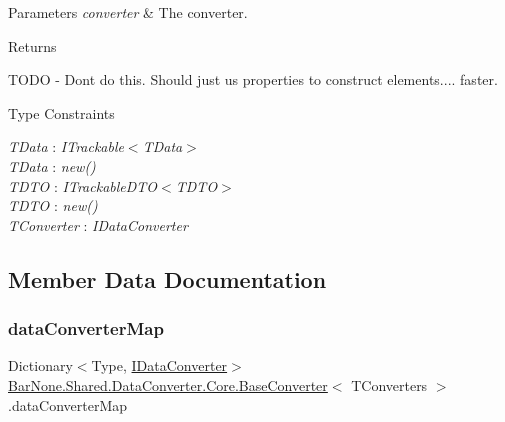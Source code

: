 \begin{DoxyParams}{Parameters}
{\em converter} & The converter.\\
\hline
\end{DoxyParams}
\begin{DoxyReturn}{Returns}

\end{DoxyReturn}
T\+O\+DO -\/ Dont do this. Should just us properties to construct elements.... faster. \begin{Desc}
\item[Type Constraints]\begin{description}
\item[{\em T\+Data} : {\em I\+Trackable$<$T\+Data$>$}]\item[{\em T\+Data} : {\em new()}]\item[{\em T\+D\+TO} : {\em I\+Trackable\+D\+TO$<$T\+D\+TO$>$}]\item[{\em T\+D\+TO} : {\em new()}]\item[{\em T\+Converter} : {\em I\+Data\+Converter}]\end{description}
\end{Desc}


\subsection{Member Data Documentation}
\mbox{\label{class_bar_none_1_1_shared_1_1_data_converter_1_1_core_1_1_base_converter_a93a6cac2afcb2b933670a222f8c0349d}} 
\subsubsection{\texorpdfstring{data\+Converter\+Map}{dataConverterMap}}
{\footnotesize\ttfamily Dictionary$<$Type, \mbox{\hyperlink{interface_bar_none_1_1_shared_1_1_data_converter_1_1_core_1_1_i_data_converter}{I\+Data\+Converter}}$>$ \mbox{\hyperlink{class_bar_none_1_1_shared_1_1_data_converter_1_1_core_1_1_base_converter}{Bar\+None.\+Shared.\+Data\+Converter.\+Core.\+Base\+Converter}}$<$ T\+Converters $>$.data\+Converter\+Map\hspace{0.3cm}{\ttfamily [private]}}



